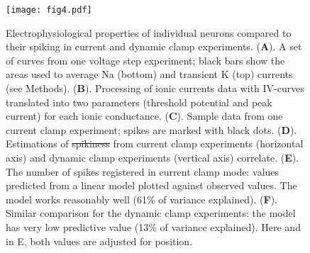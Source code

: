 \documentclass{article}
\providecommand{\DIFaddtex}[1]{{\protect\color{blue}\uwave{#1}}} %
\providecommand{\DIFdeltex}[1]{{\protect\color{red}\sout{#1}}}                      %
\providecommand{\DIFaddFL}[1]{\DIFadd{#1}} %
\providecommand{\DIFdelFL}[1]{\DIFdel{#1}} %
\providecommand{\DIFaddbeginFL}{} %
\providecommand{\DIFaddendFL}{} %
\providecommand{\DIFdelbeginFL}{} %
\providecommand{\DIFdelendFL}{} %
\providecommand{\DIFadd}[1]{\texorpdfstring{\DIFaddtex{#1}}{#1}} %
\providecommand{\DIFdel}[1]{\texorpdfstring{\DIFdeltex{#1}}{}} %
\newcommand{\DIFscaledelfig}{0.5}
\newlength{\DIFdelgraphicswidth} %
\newlength{\DIFdelgraphicsheight} %
\newcommand{\DIFaddincludegraphics}[2][]{{\color{blue}\fbox{\DIFOincludegraphics[#1]{#2}}}} %
\newcommand{\DIFdelincludegraphics}[2][]{%
\sbox{\DIFdelgraphicsbox}{\DIFOincludegraphics[#1]{#2}}%
\settoboxwidth{\DIFdelgraphicswidth}{\DIFdelgraphicsbox} %
\settoboxtotalheight{\DIFdelgraphicsheight}{\DIFdelgraphicsbox} %
\scalebox{\DIFscaledelfig}{%
\parbox[b]{\DIFdelgraphicswidth}{\usebox{\DIFdelgraphicsbox}\\[-\baselineskip] \rule{\DIFdelgraphicswidth}{0em}}\llap{\resizebox{\DIFdelgraphicswidth}{\DIFdelgraphicsheight}{%
\setlength{\unitlength}{\DIFdelgraphicswidth}%
\begin{picture}(1,1)%
\thicklines\linethickness{2pt} %
{\color[rgb]{1,0,0}\put(0,0){\framebox(1,1){}}}%
{\color[rgb]{1,0,0}\put(0,0){\line( 1,1){1}}}%
{\color[rgb]{1,0,0}\put(0,1){\line(1,-1){1}}}%
\end{picture}%
}\hspace*{3pt}}} %
} %
\DeclareRobustCommand{\DIFaddbeginFL}{\DIFOaddbeginFL \let\includegraphics\DIFaddincludegraphics} %
\DeclareRobustCommand{\DIFaddendFL}{\DIFOaddendFL \let\includegraphics\DIFOincludegraphics} %
\DeclareRobustCommand{\DIFdelbeginFL}{\DIFOdelbeginFL \let\includegraphics\DIFdelincludegraphics} %
\DeclareRobustCommand{\DIFdelendFL}{\DIFOaddendFL \let\includegraphics\DIFOincludegraphics} %
\begin{document}
\begin{figure}[!t]
\centering
\texttt{[image: fig4.pdf]}
\caption{Electrophysiological properties of individual neurons compared to their spiking in current and dynamic clamp experiments. (\textbf{A}). A set of curves from one voltage step experiment; black bars show the areas used to average Na (bottom) and transient K (top) currents (see Methods). (\textbf{B}). Processing of ionic currents data with IV-curves translated into two parameters (threshold potential and peak current) for each ionic conductance. (\textbf{C}). Sample data from one current clamp experiment; spikes are marked with black dots. (\textbf{D}). Estimations of \DIFdelbeginFL \DIFdelFL{spikiness }\DIFdelendFL \DIFaddbeginFL \DIFaddFL{excitability }\DIFaddendFL from current clamp experiments (horizontal axis) and dynamic clamp experiments (vertical axis) correlate. (\textbf{E}). The number of spikes registered in current clamp mode: values predicted from a linear model plotted against observed values. The model works reasonably well (61\% of variance explained). (\textbf{F}). Similar comparison for the dynamic clamp experiments: the model has very low predictive value (13\% of variance explained). Here and in E, both values are adjusted for position.}
\end{figure}
\end{document}
